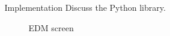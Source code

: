 \documentclass[final,t]{beamer}
\begin{document}
\begin{frame}
\begin{columns}[t]
\begin{column}{.32\linewidth}
  \end{column}



  \begin{column}{.32\linewidth}

  \begin{custombox}{Implementation}
    Discuss the Python library. 
  \end{custombox}
  
      \begin{figure}[t]
          {%
        \setlength{\fboxsep}{0pt}%
        \setlength{\fboxrule}{3pt}%
              \caption{EDM screen}
        }%
\end{figure}

  \end{column}

  

  \begin{column}{.32\linewidth}


\end{column}
\end{columns}
\end{frame}
\end{document}
